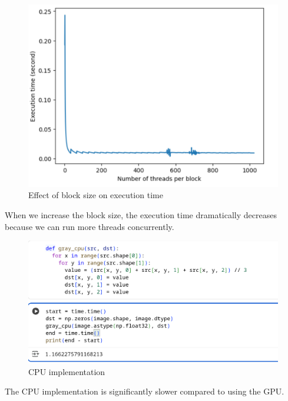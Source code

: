 \documentclass{article}
\begin{document}
\begin{figure}[h!]
    \centering
    \includegraphics[width=0.5\linewidth]{block_size_plot.png}
    \caption{Effect of block size on execution time}
    \label{fig:placeholder}
\end{figure}

When we increase the block size, the execution time dramatically decreases because we can run more threads concurrently.


\begin{figure}[h!]
    \centering
    \includegraphics[width=0.5\linewidth]{cpu.png}
    \caption{CPU implementation}
    \label{fig:placeholder}
\end{figure}

The CPU implementation is significantly slower compared to using the GPU.
\end{document}
